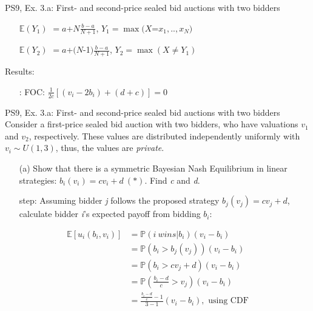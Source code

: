 \begin{frame}{PS9, Ex. 3.a: First- and second-price sealed bid auctions with two bidders}
\begin{multicols}{2}
\begin{enumerate}
        \item[$\mathbb{E}(Y_1)$] $=a$+$N\frac{b-a}{N+1}$, $Y_1=\max(X$=$x_1,..,x_N)$
        \item[$\mathbb{E}(Y_2)$] $=a$+$(N$-1$)\frac{b-a}{N+1}$, $Y_2=\max(X\neq Y_1)$
      \end{enumerate}
      \vspace{-6pt}
      Results:
      \vspace{-6pt}
      \begin{itemize}
        \item[\nth{2}:] FOC: $\frac{1}{2c}[(v_i-2b_i)+(d+c)]=0$
      \end{itemize}
      \vfill\null
    \end{multicols}
\end{frame}
\begin{frame}{PS9, Ex. 3.a: First- and second-price sealed bid auctions with two bidders}
    Consider a first-price sealed bid auction with two bidders, who have valuations $v_1$ and $v_2$, respectively. These values are distributed independently uniformly with $v_i\sim U(1,3)$, thus, the values are \textit{private}.
    \vspace{-4pt}
    \begin{itemize}
      \item[(a)] Show that there is a symmetric Bayesian Nash Equilibrium in linear strategies: $b_i(v_i) = cv_i + d\ (*)$. Find \textit{c} and \textit{d}.
    \end{itemize}
    \vspace{-8pt}
    \begin{multicols}{2}
      \begin{itemize}
        \item[\nth{1} step:] Assuming bidder \textit{j} follows the proposed strategy $b_j(v_j) = cv_j + d$, calculate bidder \textit{i}'s expected payoff from bidding $b_i$:
      \end{itemize}
      \vspace{-4pt}
      \begin{align*}
        \mathbb{E}[u_i(b_i,v_i)]&=\mathbb{P}(i\ wins|b_i)(v_i-b_i)\\
                                &=\mathbb{P}(b_i>b_j(v_j))(v_i-b_i)\\
                                &=\mathbb{P}(b_i>cv_j+d)(v_i-b_i)\\
                                &=\mathbb{P}\left(\frac{b_i-d}{c}>v_j\right)(v_i-b_i)\\
                                &=\frac{\frac{b_i-d}{c}-1}{3-1}(v_i-b_i),\text{ using CDF}\\

\end{align*}
\end{multicols}
\end{frame}
